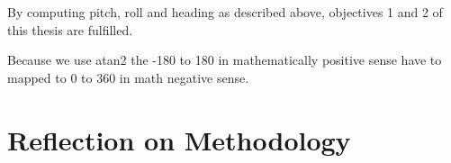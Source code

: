 By computing pitch, roll and heading as described above, objectives 1 and 2 of this thesis are fulfilled.

Because we use atan2 the -180 to 180 in mathematically positive sense have to mapped to 0 to 360 in math negative sense. 

\section{Reflection on Methodology \label{sec:meth:reflection_methodology}}